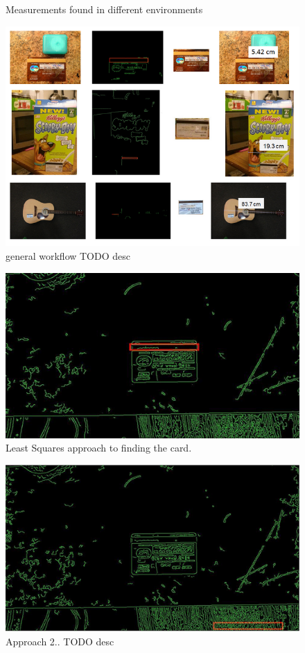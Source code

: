 \documentclass[10pt,twocolumn,letterpaper]{article}
\begin{document}
\begin{figure}[t]
\begin{center}
\end{center}
   \caption{Measurements found in different environments}
\label{fig:measurements}
\end{figure}


\begin{figure}
\begin{center}
	   \includegraphics[width=0.8\linewidth]{general-workflow}
\end{center}
   \caption{general workflow TODO desc}
\label{fig:general-workflow}
\end{figure}

\begin{figure}[t]
\begin{center}
	   \includegraphics[width=0.8\linewidth]{leastsquares}
\end{center}
   \caption{Least Squares approach to finding the card.}
\label{fig:leastsquares}
\end{figure}

\begin{figure}[t]
\begin{center}
	   \includegraphics[width=0.8\linewidth]{approach2}
\end{center}
   \caption{Approach 2.. TODO desc}
\label{fig:approach2}
\end{figure}
\end{document}
